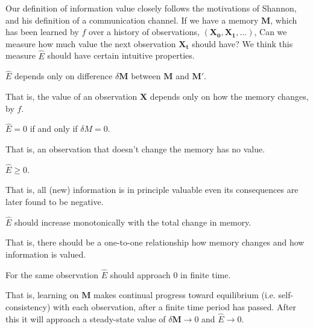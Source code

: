 
Our definition of information value closely follows the motivations of Shannon, and his definition of a communication channel. If we have a memory $\mathbf{M}$, which has been learned by $f$ over a history of observations, $(\mathbf{X_0},\mathbf{X_1},...)$, Can we measure how much value the next observation $\mathbf{X_t}$ should have? We think this measure $\hat E$ should have certain intuitive properties.

\begin{axiom}
	$\hat E$ depends only on difference $\delta \mathbf{M}$ between $\mathbf{M}$ and $\mathbf{M'}$.
\end{axiom}

That is, the value of an observation $\mathbf{X}$ depends only on how
the memory changes, by $f$. 

\begin{axiom}
	$\hat E = 0$ if and only if $\delta M = 0$. 
\end{axiom}

That is, an observation that doesn’t change the memory has no value.

\begin{axiom}
	$\hat E \ge 0$.
\end{axiom}

That is, all (new) information is in principle valuable even its consequences are later found to be negative.

\begin{axiom}
	$\hat E$ should increase monotonically with the total change in memory. 
\end{axiom}

That is, there should be a one-to-one relationship how memory changes and how information is valued.

\begin{axiom}
	For the same observation $\hat E$ should approach 0 in finite time.
\end{axiom}

That is, learning on $\mathbf{M}$ makes continual progress toward equilibrium (i.e. self-consistency) with each observation, after a finite time period has passed. After this it will approach a steady-state value of $\delta \mathbf{M} \rightarrow 0$ and $\hat E \rightarrow 0$.

